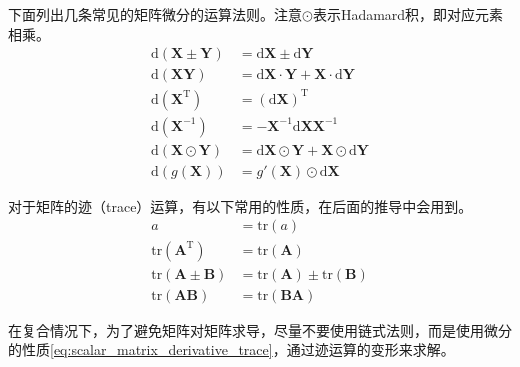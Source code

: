 \vspace{0.5\baselineskip}
下面列出几条常见的矩阵微分的运算法则。注意$\odot$表示Hadamard积，即对应元素相乘。
\begin{subequations}
	\begin{align}
		\mathrm{d}(\bm{X}\pm \bm{Y}) &= \mathrm{d}\bm{X} \pm \mathrm{d}\bm{Y} 
		\label{eq:matrix_derivative_add_sub} \\
		\mathrm{d}(\bm{XY}) &= \mathrm{d}\bm{X}\cdot \bm{Y} + \bm{X}\cdot \mathrm{d}\bm{Y}
		\label{eq:matrix_derivative_mul} \\
		\mathrm{d}(\bm{X}^{\mathrm{T}}) &= (\mathrm{d}\bm{X})^{\mathrm{T}}
		\label{eq:matrix_derivative_transpose} \\
		\mathrm{d}(\bm{X}^{-1}) &= -\bm{X}^{-1}\mathrm{d}\bm{X}\bm{X}^{-1}
		\label{eq:matrix_derivative_inverse} \\
		\mathrm{d}(\bm{X}\odot \bm{Y}) &= \mathrm{d}\bm{X}\odot \bm{Y} + \bm{X}\odot \mathrm{d}\bm{Y}
		\label{eq:matrix_derivative_hadamard} \\
		\mathrm{d}\left(g(\bm{X})\right) &= g'(\bm{X}) \odot \mathrm{d}\bm{X}
		\label{eq:matrix_derivative_hadamard2}
	\end{align}
\end{subequations}

对于矩阵的迹（trace）运算，有以下常用的性质，在后面的推导中会用到。
\begin{subequations}
	\begin{align}
		a &= \mathrm{tr}(a)
		\label{eq:matrix_trace_scalar} \\
		\mathrm{tr}(\bm{A}^{\mathrm{T}}) &= \mathrm{tr}(\bm{A})
		\label{eq:matrix_trace_transpose} \\
		\mathrm{tr}(\bm{A}\pm\bm{B}) &= \mathrm{tr}(\bm{A}) \pm \mathrm{tr}(\bm{B})
		\label{eq:matrix_trace_add_sub} \\
		\mathrm{tr}(\bm{AB}) &= \mathrm{tr}(\bm{BA})
		\label{eq:matrix_trace_mul}
	\end{align}
\end{subequations}

在复合情况下，为了避免矩阵对矩阵求导，尽量不要使用链式法则，而是使用微分的性质\eqref{eq:scalar_matrix_derivative_trace}，通过迹运算的变形来求解。

